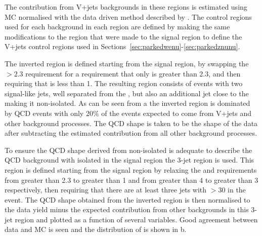 The contribution from V+jets backgrounds in these regions is estimated using \ac{MC} normalised with the data driven method described by . The control regions used for each background in each region are defined by making the same modifications to the region that were made to the signal region to define the V+jets control regions used in Sections~\ref{sec:parkedwenu}-\ref{sec:parkedznunu}.

The inverted region is defined starting from the signal region, by swapping the \jetmetdphi$>2.3$ requirement for a requirement that only \jetmetdphileading is greater than 2.3, and then requiring that \jetmetdphi is less than 1. The resulting region consists of events with two signal-like jets, well separated from the \MET, but also an additional jet close to the \MET making it non-isolated.   As can be seen from a the inverted region is dominated by \ac{QCD} events with only 20\% of the events expected to come from V+jets and other background processes. The \ac{QCD} shape is taken to be the shape of the data after subtracting the estimated contribution from all other background processes.


To ensure the \ac{QCD} shape derived from non-isolated \MET is adequate to describe the \ac{QCD} background with isolated \MET in the signal region the 3-jet region is used. This region is defined starting from the signal region by relaxing the \jetmetdphi and \METsig requirements from greater than 2.3 to greater than 1 and from greater than 4 to greater than 3 respectively, then requiring that there are at least three jets with \pt$>30$ \GeV in the event. The \ac{QCD} shape obtained from the inverted region is then normalised to the data yield minus the expected contribution from other backgrounds in this 3-jet region and plotted as a function of several variables. Good agreement between data and \ac{MC} is seen and the distribution of \METsig is shown in b. 

